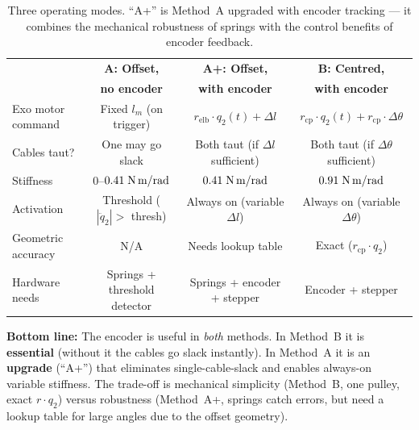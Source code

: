 \documentclass[11pt, a4paper]{article}
\begin{document}
\begin{table}[h]
\centering
\small
\begin{tabular}{@{}lccc@{}}
\toprule
& \textbf{A: Offset,}
& \textbf{A+: Offset,}
& \textbf{B: Centred,} \\
& \textbf{no encoder}
& \textbf{with encoder}
& \textbf{with encoder} \\
\midrule
Exo motor command
    & Fixed $l_m$ (on trigger)
    & $r_{\text{elb}} \cdot q_2(t) + \Delta l$
    & $r_{\text{cp}} \cdot q_2(t) + r_{\text{cp}} \cdot \Delta\theta$ \\[3pt]
Cables taut?
    & One may go slack
    & Both taut (if $\Delta l$ sufficient)
    & Both taut (if $\Delta\theta$ sufficient) \\[3pt]
Stiffness
    & $0$--$0.41\;\text{N\,m/rad}$
    & $0.41\;\text{N\,m/rad}$
    & $0.91\;\text{N\,m/rad}$ \\[3pt]
Activation
    & Threshold ($|\ddot{q}_2| > $ thresh)
    & Always on (variable $\Delta l$)
    & Always on (variable $\Delta\theta$) \\[3pt]
Geometric accuracy
    & N/A
    & Needs lookup table
    & Exact ($r_{\text{cp}} \cdot q_2$) \\[3pt]
Hardware needs
    & Springs + threshold detector
    & Springs + encoder + stepper
    & Encoder + stepper \\
\bottomrule
\end{tabular}
\caption{Three operating modes.  ``A+'' is Method~A upgraded with encoder
tracking --- it combines the mechanical robustness of springs with the
control benefits of encoder feedback.}
\label{tab:three-modes}
\end{table}

\begin{mdframed}
\textbf{Bottom line:}
The encoder is useful in \emph{both} methods.  In Method~B it is
\textbf{essential} (without it the cables go slack instantly).  In Method~A
it is an \textbf{upgrade} (``A+'') that eliminates single-cable-slack and
enables always-on variable stiffness.  The trade-off is mechanical
simplicity (Method~B, one pulley, exact $r \cdot q_2$) versus robustness
(Method~A+, springs catch errors, but need a lookup table for large angles
due to the offset geometry).
\end{mdframed}
\end{document}

